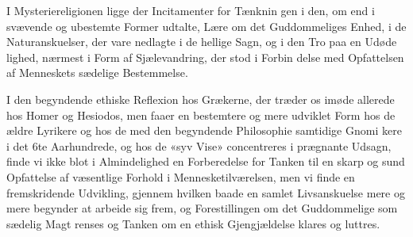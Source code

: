 \documentclass[12pt,a4paper]{book}
\begin{document}
I Mysteriereligionen ligge der Incitamenter for Tænknin\-%
gen i den, om end i svævende og ubestemte Former udtalte,
Lære om det Guddommeliges Enhed, i de Naturanskuelser, der
vare nedlagte i de hellige Sagn, og i den Tro paa en Udøde\-%
lighed, nærmest i Form af Sjælevandring, der stod i Forbin\-%
delse med Opfattelsen af Menneskets sædelige Bestemmelse.

I den begyndende ethiske Reflexion hos Grækerne, der
træder os imøde allerede hos Homer og Hesiodos, men faaer
en bestemtere og mere udviklet Form hos de ældre Lyrikere
og hos de med den begyndende Philosophie samtidige Gnomi\-%
kere i det 6te Aarhundrede, og hos de «syv Vise» concentreres
i prægnante Udsagn, finde vi ikke blot i Almindelighed en
Forberedelse for Tanken til en skarp og sund Opfattelse af
væsentlige Forhold i Mennesketilværelsen, men vi finde en
fremskridende Udvikling, gjennem hvilken baade en samlet
Livsanskuelse mere og mere begynder at arbeide sig frem, og
Forestillingen om det Guddommelige som sædelig Magt renses
og Tanken om en ethisk Gjengjældelse klares og luttres.
\end{document}
